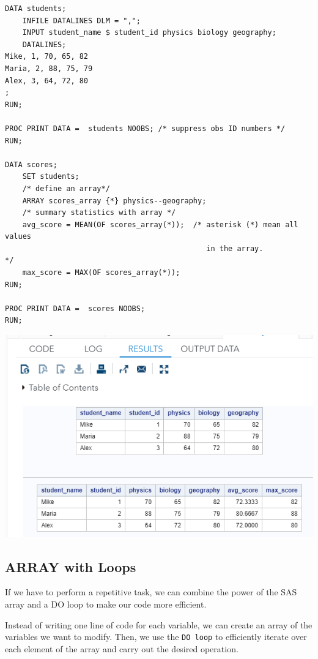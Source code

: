 \documentclass[
]{book}
\begin{document}
\begin{verbatim}
DATA students;
    INFILE DATALINES DLM = ",";
    INPUT student_name $ student_id physics biology geography;
    DATALINES;
Mike, 1, 70, 65, 82
Maria, 2, 88, 75, 79
Alex, 3, 64, 72, 80
;
RUN;
 
PROC PRINT DATA =  students NOOBS; /* suppress obs ID numbers */
RUN;
 
DATA scores;
    SET students;
    /* define an array*/
    ARRAY scores_array {*} physics--geography;
    /* summary statistics with array */
    avg_score = MEAN(OF scores_array(*));  /* asterisk (*) mean all values 
                                              in the array.              */
    max_score = MAX(OF scores_array(*));
RUN;
 
PROC PRINT DATA =  scores NOOBS;
RUN;
\end{verbatim}

\begin{center}\includegraphics[width=1\linewidth]{img11/w11-OF-Operator} \end{center}

\hypertarget{array-with-loops}{%
\subsection{ARRAY with Loops}\label{array-with-loops}}

If we have to perform a repetitive task, we can combine the power of the SAS array and a DO loop to make our code more efficient.

Instead of writing one line of code for each variable, we can create an array of the variables we want to modify. Then, we use the \texttt{DO\ loop} to efficiently iterate over each element of the array and carry out the desired operation.
\end{document}
